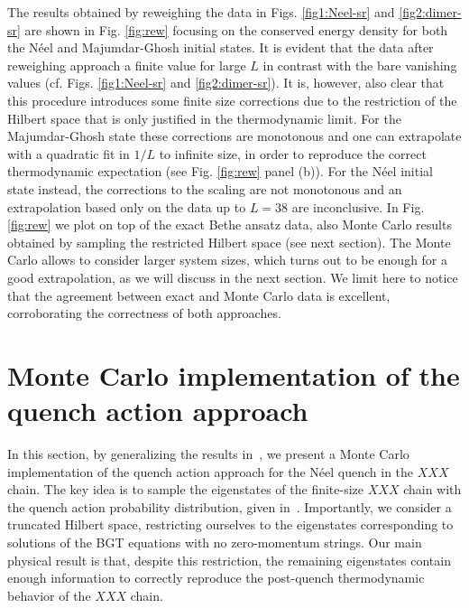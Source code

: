 \documentclass[11pt]{iopart}
\begin{document}
The results obtained by reweighing the data in Figs. \ref{fig1:Neel-sr} and \ref{fig2:dimer-sr}
are shown in Fig. \ref{fig:rew} focusing on the conserved energy density for both the N\'eel and 
Majumdar-Ghosh initial states. 
It is evident that the data after reweighing approach a finite value for large $L$ in contrast with the bare vanishing values 
(cf. Figs.  \ref{fig1:Neel-sr} and \ref{fig2:dimer-sr}). 
It is, however, also clear that this procedure introduces some finite size corrections due to the restriction of the Hilbert space that is 
only justified in the thermodynamic limit. 
%
For the Majumdar-Ghosh state these corrections are monotonous and one can extrapolate with a quadratic fit in $1/L$
to infinite size, in order to reproduce the correct thermodynamic expectation (see Fig. \ref{fig:rew} panel (b)).
%
For the N\'eel initial state instead, the corrections to the scaling are not monotonous and an extrapolation 
based only on the data up to $L=38$ are inconclusive. 
In Fig. \ref{fig:rew} we plot on top of the exact Bethe ansatz data, also Monte Carlo results obtained by sampling the restricted 
Hilbert space (see next section). 
The Monte Carlo allows to consider larger system sizes, which turns out to be enough for a good extrapolation, as we
will discuss in the next section. 
We limit here to notice that the agreement between exact and Monte Carlo data is excellent, corroborating 
the correctness of both approaches.  

\section{Monte Carlo implementation of the quench action approach}
\label{sec6:mcqa}

In this section, by generalizing the results in~\cite{alba-2015}, we present 
a Monte Carlo implementation of the quench action approach for the N\'eel quench in 
the $XXX$ chain. The key idea is to sample the eigenstates of the finite-size $XXX$ 
chain with the quench action probability distribution, given in~. 
Importantly, we consider a truncated Hilbert space, restricting ourselves to the 
eigenstates corresponding to solutions of the BGT equations with no zero-momentum 
strings. Our main physical result is that, despite this restriction, the remaining 
eigenstates contain enough information to correctly reproduce the post-quench 
thermodynamic behavior of the $XXX$ chain. 
\end{document}
